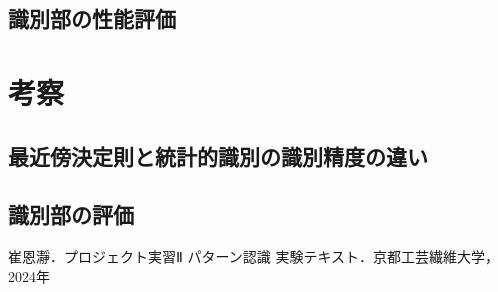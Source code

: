 \documentclass{jlreq}
\numberwithin{equation}{section}
\begin{document}
\subsection{識別部の性能評価}

\section{考察}
\subsection{最近傍決定則と統計的識別の識別精度の違い}

\subsection{識別部の評価}

\begin{thebibliography}{9}
  \item 崔恩瀞．プロジェクト実習Ⅱ パターン認識 実験テキスト．京都工芸繊維大学，2024年
\end{thebibliography}
\end{document}
